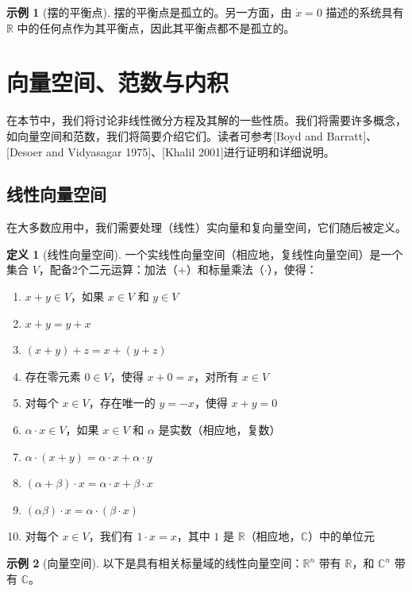 \documentclass[UTF8,12pt,a4paper]{ctexart}
\theoremstyle{definition}
\newtheorem{definition}{定义}[section]
\newtheorem{example}{示例}[section]
\begin{document}
\begin{example}[摆的平衡点]
摆的平衡点是孤立的。另一方面，由 $\dot{x}=0$ 描述的系统具有 $\mathbb{R}$ 中的任何点作为其平衡点，因此其平衡点都不是孤立的。
\end{example}

\section{向量空间、范数与内积}

在本节中，我们将讨论非线性微分方程及其解的一些性质。我们将需要许多概念，如向量空间和范数，我们将简要介绍它们。读者可参考[Boyd and Barratt]、[Desoer and Vidyasagar 1975]、[Khalil 2001]进行证明和详细说明。

\subsection{线性向量空间}

在大多数应用中，我们需要处理（线性）实向量和复向量空间，它们随后被定义。

\begin{definition}[线性向量空间]
一个实线性向量空间（相应地，复线性向量空间）是一个集合 $V$，配备2个二元运算：加法（+）和标量乘法（$\cdot$），使得：
\begin{enumerate}
\item $x+y \in V$，如果 $x \in V$ 和 $y \in V$
\item $x+y = y+x$
\item $(x+y)+z = x+(y+z)$
\item 存在零元素 $0 \in V$，使得 $x+0=x$，对所有 $x \in V$
\item 对每个 $x \in V$，存在唯一的 $y=-x$，使得 $x+y=0$
\item $\alpha \cdot x \in V$，如果 $x \in V$ 和 $\alpha$ 是实数（相应地，复数）
\item $\alpha \cdot (x+y) = \alpha \cdot x + \alpha \cdot y$
\item $(\alpha + \beta) \cdot x = \alpha \cdot x + \beta \cdot x$
\item $(\alpha \beta) \cdot x = \alpha \cdot (\beta \cdot x)$
\item 对每个 $x \in V$，我们有 $1 \cdot x = x$，其中 $1$ 是 $\mathbb{R}$（相应地，$\mathbb{C}$）中的单位元
\end{enumerate}
\end{definition}

\begin{example}[向量空间]
以下是具有相关标量域的线性向量空间：$\mathbb{R}^n$ 带有 $\mathbb{R}$，和 $\mathbb{C}^n$ 带有 $\mathbb{C}$。
\end{example}
\end{document}
